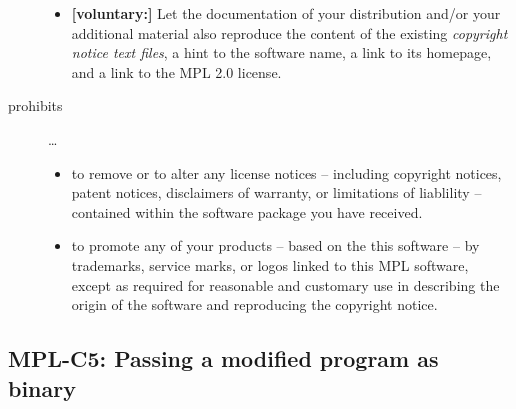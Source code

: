 \begin{description}
\begin{itemize}
  \item \textbf{[voluntary:]} Let the documentation of your distribution and/or
  your additional material also reproduce the content of the existing
  \emph{copyright notice text files}, a hint to the software name, a link to its
  homepage, and a link to the MPL 2.0 license.
  
 \end{itemize}
 
\item[prohibits] \ldots
\begin{itemize}
  \item to remove or to alter any license notices -- including copyright
  notices, patent notices, disclaimers of warranty, or limitations of liablility
  -- contained within the software package you have received.
  \item to promote any of your products -- based on the this software -- by
  trademarks, service marks, or logos linked to this MPL software, except as 
  required for reasonable and customary use in describing the origin
  of the software and reproducing the  copyright notice.
\end{itemize}

\end{description}

\subsection{MPL-C5: Passing a modified program as binary}
\label{OSUC-04B-MPL} 

